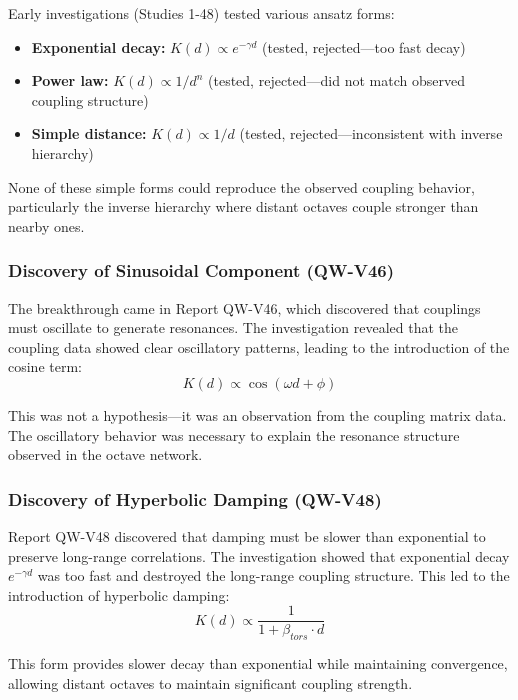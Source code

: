 \documentclass[11pt, a4paper]{article}
\begin{document}
Early investigations (Studies 1-48) tested various ansatz forms:
\begin{itemize}
    \item \textbf{Exponential decay:} $K(d) \propto e^{-\gamma d}$ (tested, rejected—too fast decay)
    \item \textbf{Power law:} $K(d) \propto 1/d^n$ (tested, rejected—did not match observed coupling structure)
    \item \textbf{Simple distance:} $K(d) \propto 1/d$ (tested, rejected—inconsistent with inverse hierarchy)
\end{itemize}

None of these simple forms could reproduce the observed coupling behavior, particularly the inverse hierarchy where distant octaves couple stronger than nearby ones.

\subsubsection{Discovery of Sinusoidal Component (QW-V46)}

The breakthrough came in Report QW-V46, which discovered that couplings must oscillate to generate resonances. The investigation revealed that the coupling data showed clear oscillatory patterns, leading to the introduction of the cosine term:
\begin{equation}
K(d) \propto \cos(\omega d + \phi)
\end{equation}

This was not a hypothesis—it was an observation from the coupling matrix data. The oscillatory behavior was necessary to explain the resonance structure observed in the octave network.

\subsubsection{Discovery of Hyperbolic Damping (QW-V48)}

Report QW-V48 discovered that damping must be slower than exponential to preserve long-range correlations. The investigation showed that exponential decay $e^{-\gamma d}$ was too fast and destroyed the long-range coupling structure. This led to the introduction of hyperbolic damping:
\begin{equation}
K(d) \propto \frac{1}{1 + \beta_{tors} \cdot d}
\end{equation}

This form provides slower decay than exponential while maintaining convergence, allowing distant octaves to maintain significant coupling strength.
\end{document}

